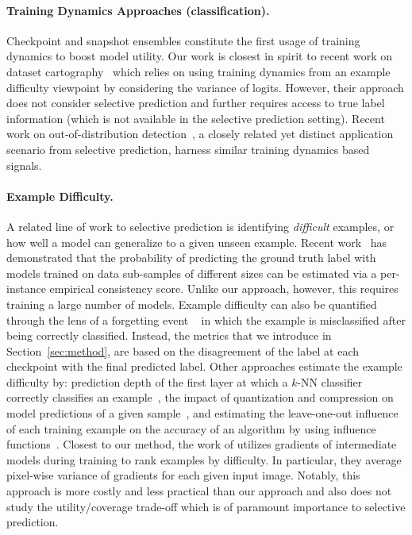 \paragraph{Training Dynamics Approaches (classification).} Checkpoint and snapshot ensembles \citep{huang2017snapshot, chen2017checkpoint} constitute the first usage of training dynamics to boost model utility. Our work is closest in spirit to recent work on dataset cartography~\citep{swayamdipta2020dataset} which relies on using training dynamics from an example difficulty viewpoint by considering the variance of logits. However, their approach does not consider selective prediction and further requires access to true label information (which is not available in the selective prediction setting). Recent work on out-of-distribution detection~\citep{adila2022understanding}, a closely related yet distinct application scenario from selective prediction, harness similar training dynamics based signals.


\paragraph{Example Difficulty.}
\label{sec:example_diff}

A related line of work to selective prediction is identifying \emph{difficult} examples, or how well a model can generalize to a given unseen example. Recent work~\cite{jiang2020characterizing} has demonstrated that the probability of predicting the ground truth label with models trained on data sub-samples of different sizes can be estimated via a per-instance empirical consistency score. Unlike our approach, however, this requires training a large number of models. 
Example difficulty can also be quantified through the lens of a forgetting event ~\cite{toneva2018empirical} in which the example is misclassified after being correctly classified. Instead, the metrics that we introduce in Section~\ref{sec:method}, are based on the disagreement of the label at each checkpoint with the final predicted label. Other approaches estimate the example difficulty by: 
prediction depth of the first layer at which a $k$-NN classifier correctly classifies an example~\citep{baldock2021deep}, the impact of quantization and compression on model predictions of a given sample~\citep{hooker2019compressed}, and estimating the leave-one-out influence of each training example on the accuracy of an algorithm by using influence functions~\citep{feldman2020neural}. 
Closest to our method, the work of \cite{agarwal2020estimating} utilizes gradients of intermediate models during training to rank examples by  difficulty. In particular, they average pixel-wise variance of gradients for each given input image. 
Notably, this approach is more costly and less practical than our approach and also does not study the utility/coverage trade-off which is of paramount importance to selective prediction.

